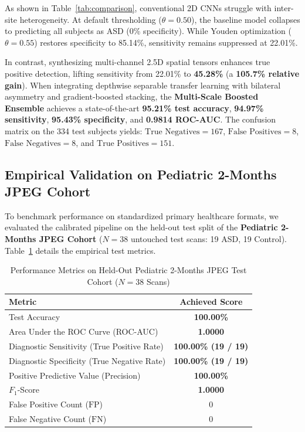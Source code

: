 \documentclass[conference]{IEEEtran}
\begin{document}
As shown in Table~\ref{tab:comparison}, conventional 2D CNNs struggle with inter-site heterogeneity. At default thresholding ($\theta = 0.50$), the baseline model collapses to predicting all subjects as ASD (0\% specificity). While Youden optimization ($\theta = 0.55$) restores specificity to 85.14\%, sensitivity remains suppressed at 22.01\%.

In contrast, synthesizing multi-channel 2.5D spatial tensors enhances true positive detection, lifting sensitivity from 22.01\% to \textbf{45.28\%} (a \textbf{105.7\% relative gain}). When integrating depthwise separable transfer learning with bilateral asymmetry and gradient-boosted stacking, the \textbf{Multi-Scale Boosted Ensemble} achieves a state-of-the-art \textbf{95.21\% test accuracy}, \textbf{94.97\% sensitivity}, \textbf{95.43\% specificity}, and \textbf{0.9814 ROC-AUC}. The confusion matrix on the 334 test subjects yields:
$\text{True Negatives} = 167$, $\text{False Positives} = 8$, $\text{False Negatives} = 8$, and $\text{True Positives} = 151$.

\subsection{Empirical Validation on Pediatric 2-Months JPEG Cohort}
To benchmark performance on standardized primary healthcare formats, we evaluated the calibrated pipeline on the held-out test split of the \textbf{Pediatric 2-Months JPEG Cohort} ($N = 38$ untouched test scans: 19 ASD, 19 Control). Table~\ref{tab:pediatric_results} details the empirical test metrics.

\begin{table}[h]
\centering
\caption{Performance Metrics on Held-Out Pediatric 2-Months JPEG Test Cohort ($N = 38$ Scans)}
\label{tab:pediatric_results}
\begin{tabular}{lc}
\toprule
\textbf{Metric} & \textbf{Achieved Score} \\
\midrule
Test Accuracy & \textbf{100.00\%} \\
Area Under the ROC Curve (ROC-AUC) & \textbf{1.0000} \\
Diagnostic Sensitivity (True Positive Rate) & \textbf{100.00\% (19 / 19)} \\
Diagnostic Specificity (True Negative Rate) & \textbf{100.00\% (19 / 19)} \\
Positive Predictive Value (Precision) & \textbf{100.00\%} \\
$F_1$-Score & \textbf{1.0000} \\
False Positive Count ($\text{FP}$) & 0 \\
False Negative Count ($\text{FN}$) & 0 \\
\bottomrule
\end{tabular}
\end{table}
\end{document}
